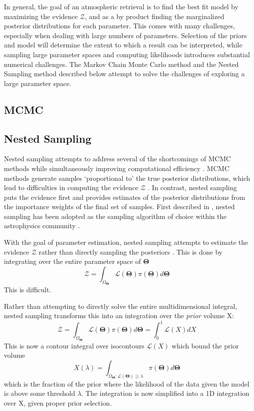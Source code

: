 In general, the goal of an atmospheric retrieval is to find the best fit model by maximizing the evidence $\mathcal{Z}$, and as a by product finding the marginalized posterior distributions for each parameter.
This comes with many challenges, especially when dealing with large numbers of parameters.
Selection of the priors and model will determine the extent to which a result can be interpreted, while sampling large parameter spaces and computing likelihoods introduces substantial numerical challenges. 
The Markov Chain Monte Carlo method and the Nested Sampling method described below attempt to solve the challenges of exploring a large parameter space.
\subsection{MCMC}
\cite{Foreman-Mackey2013} %
\cite{MacKay2003} %
\subsection{Nested Sampling}
Nested sampling attempts to address several of the shortcomings of MCMC methods while simultaneously improving computational efficiency \parencite{Skilling2004}.
MCMC methods generate samples `proportional to' the true posterior distributions, which lead to difficulties in computing the evidence $\mathcal{Z}$ \parencite{Speagle2020}. 
In contrast, nested sampling puts the evidence first and provides estimates of the posterior distributions from the importance weights of the final set of samples. First described in \parencite{Skilling2004}, nested sampling has been adopted as the sampling algorithm of choice within the astrophysics community \parencite{Feroz2009,Buchner2014,Feroz2019,Speagle2020}.

With the goal of parameter estimation, nested sampling attempts to estimate the evidence $\mathcal{Z}$ rather than directly sampling the posteriors \parencite{Skilling2004}. 
This is done by integrating over the entire parameter space of $\mathbf{\Theta}$
\begin{equation}
\mathcal{Z} = \int_{\Omega_{\mathbf{\Theta}}}\mathcal{L}(\mathbf{\Theta})\pi(\mathbf{\Theta})d\mathbf{\Theta}
\end{equation}
This is difficult.

Rather than attempting to directly solve the entire multidimensional integral, nested sampling transforms this into an integration over the \textit{prior} volume X:
\begin{equation}
\mathcal{Z} = \int_{\Omega_{\mathbf{\Theta}}}\mathcal{L}(\mathbf{\Theta})\pi(\mathbf{\Theta})d\mathbf{\Theta} = \int_{0}^{1}\mathcal{L}(X)dX
\end{equation}
This is now a contour integral over isocontours $\mathcal{L}(X)$ which bound the prior volume
\begin{equation}
X(\lambda) = \int_{\Omega_{\mathbf{\Theta}}:\mathcal{L}(\mathbf{\Theta})\geq\lambda}\pi(\mathbf{\Theta})d\mathbf{\Theta}
\end{equation} 
which is the fraction of the prior where the likelihood of the data given the model is above some threshold $\lambda$.
The integration is now simplified into a 1D integration over X, given proper prior selection.

